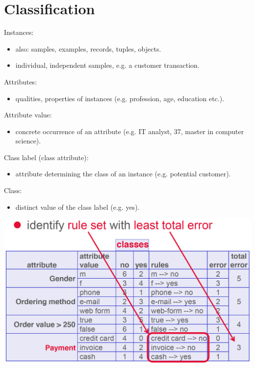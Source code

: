 
\section{Classification}

\begin{breakbox}
\newline Instances:
\begin{itemize}
	\item also: samples, examples, records, tuples, objects.
	\item individual, independent samples, e.g. a customer transaction.
\end{itemize}
 Attributes:
\begin{itemize}
	\item qualities, properties of instances (e.g. profession, age, education etc.).
\end{itemize}
 Attribute value:
\begin{itemize}
	\item concrete occurrence of an attribute (e.g. IT analyst, 37, master in computer science).
\end{itemize}
Class label (class attribute):
\begin{itemize}
	\item attribute determining the class of an instance (e.g. potential customer).
\end{itemize}
Class:
\begin{itemize}
	\item distinct value of the class label (e.g. yes).
\end{itemize}
\end{breakbox}

\begin{breakbox}
\begin{center}
\includegraphics[width=.15\textwidth]{slides_images/1r_algorithm}
\end{center}
\end{breakbox}

